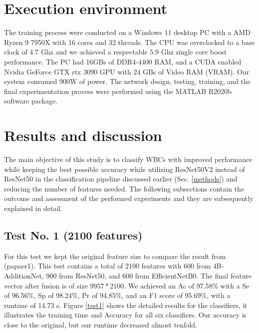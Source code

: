 \documentclass[conference]{IEEEtran}
\begin{document}





\section{Execution environment}
The training process were conducted on a Windows 11 desktop PC with a AMD Ryzen 9 7950X with 16 cores and 32 threads. The CPU was overclocked to a base clock of 4.7 Ghz and we achieved a respectable 5.9 Ghz single core boost performance. The PC had 16GBs of DDR4-4400 RAM, and a CUDA enabled Nvidia GeForce GTX rtx 3090 GPU with 24 GBs of Video RAM (VRAM). Our system consumed 900W of power. The network design, testing, training, and the final experimentation process were performed using the MATLAB R2020b software package.
\section{Results and discussion}

The main objective of this study is to classify WBCs with improved performance while keeping the best possible accuracy while utilizing ResNet50V2 instead of ResNet50 in the classification pipeline discussed earlier (Sec. \ref{methods}) and reducing the number of features needed.
The following subsections contain the outcome and assessment of the performed experiments and they are subsequently explained in detail.

\subsection{Test No. 1 (2100 features)}
For this test we kept the original feature size to compare the result from (papaer1).
This test contains a total of 2100 features with 600 from 4B-AdditionNet, 900 from ResNet50, and 600 from EfficientNetB0. 
The final feature vector after fusion is of size $9957*2100$.
We achieved an Ac of 97.58\% with a Se of 96.56\%, Sp of 98.24\%, Pr of 94.85\%, and an F1 score of 95.69\%, with a runtime of 14.73 s. 
Figure \ref{test1} shows the detailed results for the classifiers, it illustrates the training time and Accuracy for all six classifiers.
Our accuracy is close to the original, but our runtime decreased almost tenfold.
\end{document}
